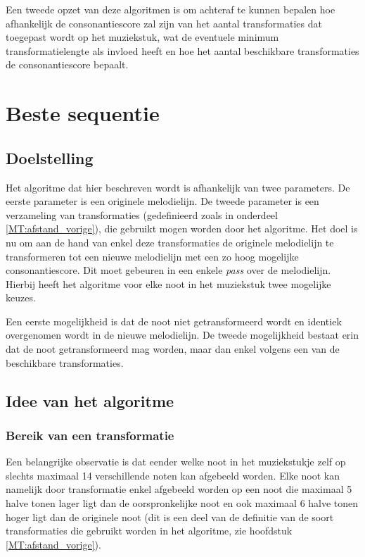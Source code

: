 Een tweede opzet van deze algoritmen is om achteraf te kunnen bepalen hoe afhankelijk de consonantiescore zal zijn van het aantal transformaties dat toegepast wordt op het muziekstuk, wat de eventuele minimum transformatielengte als invloed heeft en hoe het aantal beschikbare transformaties de consonantiescore bepaalt.

\section{Beste sequentie}
\label{ETT:algo1}

\subsection{Doelstelling}
Het algoritme dat hier beschreven wordt is afhankelijk van twee parameters. De eerste parameter is een originele melodielijn. De tweede parameter is een verzameling van transformaties (gedefinieerd zoals in onderdeel \ref{MT:afstand_vorige}), die gebruikt mogen worden door het algoritme. Het doel is nu om aan de hand van enkel deze transformaties de originele melodielijn te transformeren tot een nieuwe melodielijn met een zo hoog mogelijke consonantiescore. Dit moet gebeuren in een enkele \textit{pass} over de melodielijn. Hierbij heeft het algoritme voor elke noot in het muziekstuk twee mogelijke keuzes.
 
Een eerste mogelijkheid is dat de noot niet getransformeerd wordt en identiek overgenomen wordt in de nieuwe melodielijn. De tweede mogelijkheid bestaat erin dat de noot getransformeerd mag worden, maar dan enkel volgens een van de beschikbare transformaties.

\subsection{Idee van het algoritme}
\subsubsection{Bereik van een transformatie}
Een belangrijke observatie is dat eender welke noot in het muziekstukje zelf op slechts maximaal 14 verschillende noten kan afgebeeld worden. Elke noot kan namelijk door transformatie enkel afgebeeld worden op een noot die maximaal 5 halve tonen lager ligt dan de oorspronkelijke noot en ook maximaal 6 halve tonen hoger ligt dan de originele noot (dit is een deel van de definitie van de soort transformaties die gebruikt worden in het algoritme, zie hoofdstuk \ref{MT:afstand_vorige}).

